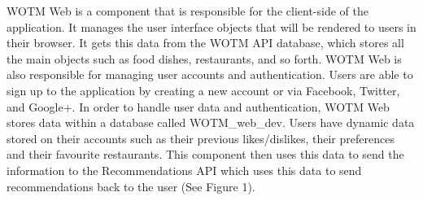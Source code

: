 WOTM Web is a component that is responsible for the client-side of the application. It manages the user interface objects that will be rendered to users in their browser. It gets this data from the WOTM API database, which stores all the main objects such as food dishes, restaurants, and so forth. WOTM Web is also responsible for managing user accounts and authentication. Users are able to sign up to the application by creating a new account or via Facebook, Twitter, and Google+. In order to handle user data and authentication, WOTM Web stores data within a database called WOTM\_web\_dev. Users have dynamic data stored on their accounts such as their previous likes/dislikes, their preferences and their favourite restaurants. This component then uses this data to send the information to the Recommendations API which uses this data to send recommendations back to the user (See Figure 1). 


